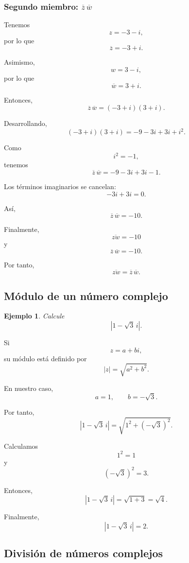 \documentclass[12pt]{article}
\newtheorem{Ejem}{Ejemplo}
\begin{document}
\subsubsection*{Segundo miembro:
$\overline z\,\overline w$}

Tenemos
\[
z=-3-i,
\]
por lo que
\[
\overline z=-3+i.
\]

Asimismo,
\[
w=3-i,
\]
por lo que
\[
\overline w=3+i.
\]

Entonces,
\[
\overline z\,\overline w
=
(-3+i)(3+i).
\]

Desarrollando,
\[
(-3+i)(3+i)
=
-9-3i+3i+i^2.
\]

Como
\[
i^2=-1,
\]
tenemos
\[
\overline z\,\overline w
=
-9-3i+3i-1.
\]

Los términos imaginarios se cancelan:
\[
-3i+3i=0.
\]

Así,
\[
\boxed{
\overline z\,\overline w=-10
}.
\]

Finalmente,
\[
\overline{zw}=-10
\]
y
\[
\overline z\,\overline w=-10.
\]

Por tanto,
\[
\boxed{
\overline{zw}=\overline z\,\overline w
}.
\]

\subsection{Módulo de un número complejo}

\begin{Ejem}
Calcule
\[
|1-\sqrt3\,i|.
\]
\end{Ejem}

Si
\[
z=a+bi,
\]
su módulo está definido por
\[
|z|=\sqrt{a^2+b^2}.
\]

En nuestro caso,
\[
a=1,
\qquad
b=-\sqrt3.
\]

Por tanto,
\[
|1-\sqrt3\,i|
=
\sqrt{1^2+(-\sqrt3)^2}.
\]

Calculamos
\[
1^2=1
\]
y
\[
(-\sqrt3)^2=3.
\]

Entonces,
\[
|1-\sqrt3\,i|
=
\sqrt{1+3}
=
\sqrt4.
\]

Finalmente,
\[
\boxed{
|1-\sqrt3\,i|=2
}.
\]

\subsection{División de números complejos}
\end{document}
